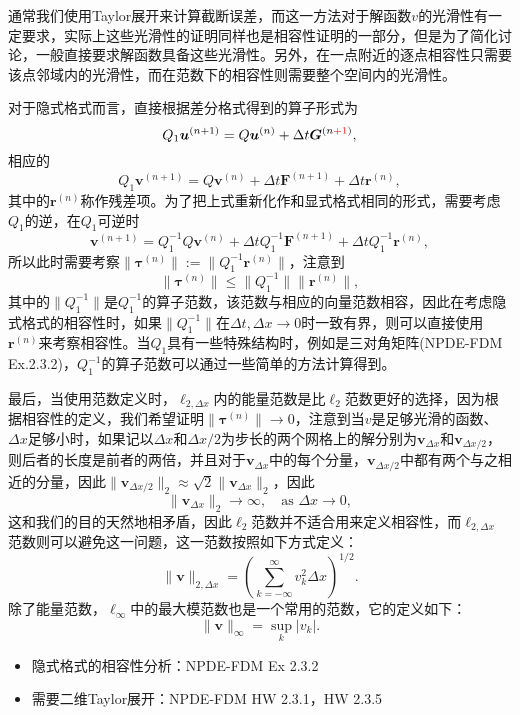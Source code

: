 \documentclass[a4paper,10pt]{ctexart}
\begin{document}
通常我们使用Taylor展开来计算截断误差，而这一方法对于解函数$ v $的光滑性有一定要求，实际上这些光滑性的证明同样也是相容性证明的一部分，但是为了简化讨论，一般直接要求解函数具备这些光滑性。另外，在一点附近的逐点相容性只需要该点邻域内的光滑性，而在范数下的相容性则需要整个空间内的光滑性。

对于隐式格式而言，直接根据差分格式得到的算子形式为
\[
    Q_1 \bm{u}^{(n+1)} = Q \bm{u}^{(n)} + \Delta t \bm{G}^{(n\textcolor{red}{+1})},
\]
相应的
\[
    Q_1 \bm{v}^{(n+1)} = Q \bm{v}^{(n)} + \Delta t \bm{F}^{(n+1)}+ \Delta t \bm{r}^{(n)},
\]
其中的$ \bm{r}^{(n)} $称作残差项。为了把上式重新化作和显式格式相同的形式，需要考虑$ Q_1 $的逆，在$ Q_1 $可逆时
\[
    \bm{v}^{(n+1)} = Q_1^{-1}Q \bm{v}^{(n)} + \Delta t Q_1^{-1}\bm{F}^{(n+1)}+ \Delta t Q_1^{-1}\bm{r}^{(n)},
\]
所以此时需要考察$ \| \bm{\tau}^{(n)} \| := \| Q_1^{-1} \bm{r}^{(n)} \| $，注意到
\[
    \| \bm{\tau}^{(n)} \| \leq \| Q_1^{-1} \| \| \bm{r}^{(n)} \|,
\]
其中的$ \| Q_1^{-1} \| $是$ Q_1^{-1} $的算子范数，该范数与相应的向量范数相容，因此在考虑隐式格式的相容性时，如果$ \| Q_1^{-1} \| $在$ \Delta t,\Delta x\to 0 $时一致有界，则可以直接使用$ \bm{r}^{(n)} $来考察相容性。当$ Q_1 $具有一些特殊结构时，例如是三对角矩阵(NPDE-FDM Ex.2.3.2)，$ Q_1^{-1} $的算子范数可以通过一些简单的方法计算得到。

最后，当使用范数定义时，$ \ell_{2,\Delta x} $内的能量范数是比$ \ell_{2} $范数更好的选择，因为根据相容性的定义，我们希望证明$ \| \bm{\tau}^{(n)} \|\to 0  $，注意到当$ v $是足够光滑的函数、$ \Delta x $足够小时，如果记以$ \Delta x $和$ \Delta x / 2 $为步长的两个网格上的解分别为$ \bm{v}_{\Delta x} $和$ \bm{v}_{\Delta x / 2} $，则后者的长度是前者的两倍，并且对于$ \bm{v}_{\Delta x} $中的每个分量，$ \bm{v}_{\Delta x / 2} $中都有两个与之相近的分量，因此$ \| \bm{v}_{\Delta x / 2} \|_2 \approx \sqrt{2} \| \bm{v}_{\Delta x} \|_2 $，因此
\[
    \| \bm{v}_{\Delta x} \|_2 \longrightarrow \infty, \quad \text{as } \Delta x\longrightarrow 0,
\]
这和我们的目的天然地相矛盾，因此$ \ell_{2} $范数并不适合用来定义相容性，而$ \ell_{2,\Delta x} $范数则可以避免这一问题，这一范数按照如下方式定义：
\begin{equation}
    \| \bm{v} \|_{2,\Delta x} = \left( \sum_{k=-\infty}^\infty v_k^2 \Delta x \right)^{1 / 2}.
\end{equation}
除了能量范数，$ \ell_\infty $中的最大模范数也是一个常用的范数，它的定义如下：
\begin{equation}
    \| \bm{v} \|_\infty = \sup_k |v_k|.
\end{equation}
\begin{itemize}
    \item 隐式格式的相容性分析：NPDE-FDM Ex 2.3.2
    \item 需要二维Taylor展开：NPDE-FDM HW 2.3.1，HW 2.3.5
\end{itemize}
\end{document}
